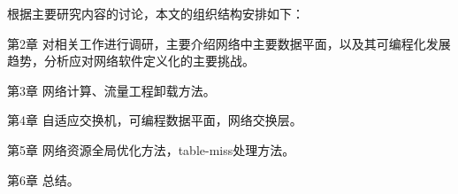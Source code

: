 
根据主要研究内容的讨论，本文的组织结构安排如下：

第2章 对相关工作进行调研，主要介绍网络中主要数据平面，以及其可编程化发展趋势，分析应对网络软件定义化的主要挑战。

第3章 网络计算、流量工程卸载方法。

第4章 自适应交换机，可编程数据平面，网络交换层。

第5章 网络资源全局优化方法，table-miss处理方法。

第6章 总结。









































